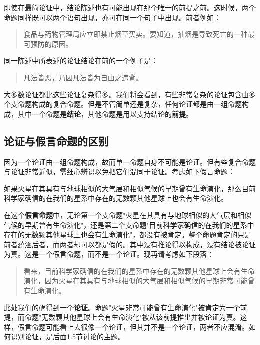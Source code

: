 即使在最简论证中，结论陈述也有可能出现在那个唯一的前提之前。这时候，两个命题同样既可以两个语句出现，亦可在同一个句子中出现。前者例如：

\begin{quotation}
食品与药物管理局应立即禁止烟草买卖。要知道，抽烟是导致死亡的一种最可预防的原因。\cite{ban1992}
\end{quotation}

同一陈述中所表述的论证结论在前的一个例子是：

\begin{quotation}
凡法皆恶，乃因凡法皆为自由之违背。\cite{bentham1802}
\end{quotation}

大多数论证都比这些论证复杂得多。我们将会看到，有些非常复杂的论证包含由多个支命题构成的复合命题。但是不管简单还是复杂，任何论证都是由一组命题构成，其中一个命题是\textbf{结论}，其他命题是用以支持结论的\textbf{前提}。

\subsection{论证与假言命题的区别}

因为一个论证由一组命题构成，故而单一命题自身不可能是论证。但有些复合命题与论证非常近似，需细心辨识以免把它们混同于论证。考虑如下假言命题：

\begin{displayquote}
如果火星在其具有与地球相似的大气层和相似气候的早期曾有生命演化，那么目前科学家确信的在我们的星系中存在的无数颗其他星球上也会有生命演化。
\end{displayquote}

在这个\textbf{假言命题}中，无论第一个支命题"火星在其具有与地球相似的大气层和相似气候的早期曾有生命演化"，还是第二个支命题"目前科学家确信的在我们的星系中存在的无数颗其他星球上也会有生命演化"，都没有被肯定。整个命题肯定的只是前者蕴涵后者，而两者却可以都是假的。其中没有推论得以构成，没有结论被论证为真。这是一个假言命题，而不是一个论证。现再请考虑如下段落：

\begin{quotation}
看来，目前科学家确信的在我们的星系中存在的无数颗其他星球上会有生命演化，因为火星在其具有与地球相似的大气层和相似气候的早期非常可能曾有生命演化。\cite{zare1996}
\end{quotation}

此处我们的确得到一个\textbf{论证}。命题"火星非常可能曾有生命演化"被肯定为一个前提，而命题"无数颗其他星球上会有生命演化"被从该前提推出并被论证为真。这样，假言命题可能看上去很像一个论证，但其并不是一个论证，两者不应混淆。如何识别论证，是后面1.5节讨论的主题。

